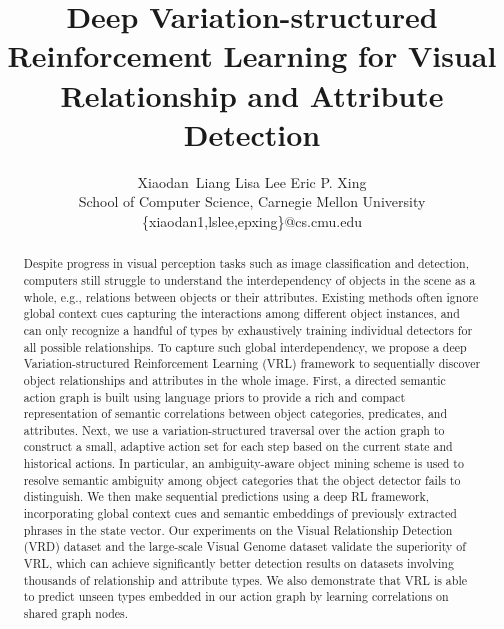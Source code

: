 \documentclass[10pt,twocolumn,letterpaper]{article}
\begin{document}
\title{Deep Variation-structured Reinforcement Learning for Visual Relationship and Attribute Detection}

\author{Xiaodan~Liang \quad Lisa Lee \quad Eric P. Xing \\
School of Computer Science, Carnegie Mellon University\\
\{xiaodan1,lslee,epxing\}@cs.cmu.edu
}

\maketitle


\begin{abstract}
	
Despite progress in visual perception tasks such as image classification and detection, computers still struggle to understand the interdependency of objects in the  scene as a whole, e.g., relations between objects or their attributes. Existing methods often ignore global context cues capturing the interactions among different object instances, and can only recognize a handful of types by exhaustively training individual detectors for all possible relationships. To capture such global interdependency, we propose a deep Variation-structured Reinforcement Learning (VRL) framework to sequentially discover object relationships and attributes in the whole image. First, a directed semantic action graph is built using language priors to provide a rich and compact representation of semantic correlations between object categories, predicates, and attributes. Next, we use a variation-structured traversal over the action graph to construct a small, adaptive action set for each step based on the current state and historical actions. In particular, an ambiguity-aware object mining scheme is used to resolve semantic ambiguity among object categories that the object detector fails to distinguish. We then make sequential predictions using a deep RL framework, incorporating global context cues and semantic embeddings of previously extracted phrases in the state vector. Our experiments on the Visual Relationship Detection (VRD) dataset and the large-scale Visual Genome dataset validate the superiority of VRL, which can achieve significantly better detection results on datasets involving thousands of relationship and attribute types. We also demonstrate that VRL is able to predict unseen types embedded in our action graph by learning correlations on shared graph nodes.
\end{abstract}
\end{document}
